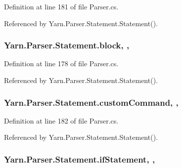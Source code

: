 Definition at line 181 of file Parser.\-cs.



Referenced by Yarn.\-Parser.\-Statement.\-Statement().

\hypertarget{a00160_ac14dfc7210974b4cd86402ed011fb0b6}{
\subsubsection[{block}]{ Yarn.\-Parser.\-Statement.\-block\hspace{0.3cm}{\ttfamily [get]}, {\ttfamily [set]}, {\ttfamily [package]}}}\label{a00160_ac14dfc7210974b4cd86402ed011fb0b6}


Definition at line 178 of file Parser.\-cs.



Referenced by Yarn.\-Parser.\-Statement.\-Statement().

\hypertarget{a00160_a8a98e7d4c66f9909da865f0e671d69f2}{
\subsubsection[{custom\-Command}]{ Yarn.\-Parser.\-Statement.\-custom\-Command\hspace{0.3cm}{\ttfamily [get]}, {\ttfamily [set]}, {\ttfamily [package]}}}\label{a00160_a8a98e7d4c66f9909da865f0e671d69f2}


Definition at line 182 of file Parser.\-cs.



Referenced by Yarn.\-Parser.\-Statement.\-Statement().

\hypertarget{a00160_a9a71577456598af0f25b23ccd02154e4}{
\subsubsection[{if\-Statement}]{ Yarn.\-Parser.\-Statement.\-if\-Statement\hspace{0.3cm}{\ttfamily [get]}, {\ttfamily [set]}, {\ttfamily [package]}}}\label{a00160_a9a71577456598af0f25b23ccd02154e4}


